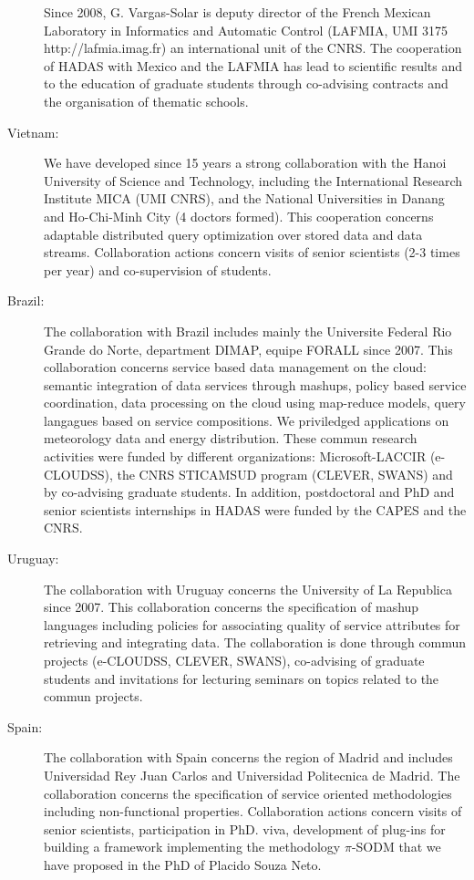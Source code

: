 \begin{description}
Since 2008, G. Vargas-Solar is deputy director of the French Mexican Laboratory in Informatics and Automatic Control (LAFMIA, UMI 3175 http://lafmia.imag.fr) an international unit of the CNRS. 
The cooperation of HADAS with Mexico and the LAFMIA has lead to scientific results and to the education of graduate students through co-advising contracts and the organisation of thematic schools. 

\item[Vietnam:] We have developed since 15 years a strong collaboration with the Hanoi University of Science and Technology, including the International Research Institute MICA (UMI CNRS), and the National Universities in Danang and Ho-Chi-Minh City (4 doctors formed). This cooperation concerns adaptable distributed query optimization over stored data and data streams. Collaboration actions concern visits of senior scientists (2-3 times per year) and co-supervision of students.

\item[Brazil:] 
The collaboration with Brazil includes mainly the Universite Federal Rio Grande do Norte, department DIMAP,  equipe FORALL since 2007. This collaboration concerns service based data management on the cloud: semantic integration of data services through mashups, policy based service coordination, data processing on the cloud using map-reduce models, query langagues based on service compositions.  We priviledged applications on meteorology data and energy distribution. These commun research activities were funded by different organizations: 
Microsoft-LACCIR (e-CLOUDSS), the CNRS STICAMSUD program (CLEVER, SWANS) and by co-advising graduate students. In addition, postdoctoral and PhD and senior scientists internships in HADAS were funded by the CAPES and the CNRS.   

\item[Uruguay:] 
The collaboration with Uruguay concerns the University of La Republica since 2007. This collaboration concerns the specification of mashup languages including policies for associating quality of service attributes for retrieving and integrating data. The collaboration is done through commun projects (e-CLOUDSS, CLEVER, SWANS), co-advising of graduate students and invitations for lecturing seminars on topics related to the commun projects.

\item[Spain:] 
The collaboration with Spain concerns the region of Madrid and includes Universidad Rey Juan Carlos and Universidad Politecnica de Madrid. The collaboration concerns the specification of service oriented methodologies including non-functional properties. Collaboration actions concern visits of senior scientists, participation in PhD. viva, development of plug-ins for building a framework implementing the methodology $\pi$-SODM that we have proposed in the PhD of Placido Souza Neto. 

\end{description}


